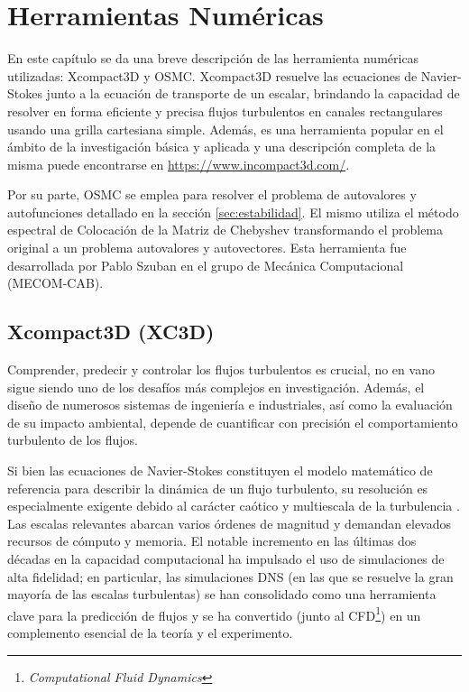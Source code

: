\chapter{Herramientas Numéricas} \label{cap:numerico}

En este capítulo se da una breve descripción de las herramienta numéricas utilizadas: Xcompact3D y OSMC. Xcompact3D resuelve las ecuaciones de Navier-Stokes junto a la ecuación de transporte de un escalar, brindando la capacidad de resolver en forma eficiente y precisa flujos turbulentos en canales rectangulares usando una grilla cartesiana simple. Además, es una herramienta popular en el ámbito de la investigación básica y aplicada y una descripción completa de la misma puede encontrarse en \url{https://www.incompact3d.com/}.

Por su parte, OSMC se emplea para resolver el problema de autovalores y autofunciones detallado en la sección \ref{sec:estabilidad}. El mismo utiliza el método espectral de Colocación de la Matriz de Chebyshev transformando el problema original a un problema autovalores y autovectores. Esta herramienta fue desarrollada por Pablo Szuban \cite{szuban2023} en el grupo de Mecánica Computacional (MECOM-CAB). 


\section{Xcompact3D (XC3D)}

Comprender, predecir y controlar los flujos turbulentos es crucial, no en vano sigue siendo uno de los desafíos más complejos en investigación. Además, el diseño de numerosos sistemas de ingeniería e industriales, así como la evaluación de su impacto ambiental, depende de cuantificar con precisión el comportamiento turbulento de los flujos.

Si bien las ecuaciones de Navier-Stokes constituyen el modelo matemático de referencia para describir la dinámica de un flujo turbulento, su resolución es especialmente exigente debido al carácter caótico y multiescala de la turbulencia \cite{pope2001turbulent}. Las escalas relevantes abarcan varios órdenes de magnitud y demandan elevados recursos de cómputo y memoria. El notable incremento en las últimas dos décadas en la capacidad computacional ha impulsado el uso de simulaciones de alta fidelidad; en particular, las simulaciones DNS (en las que se resuelve la gran mayoría de las escalas turbulentas) se han consolidado como una herramienta clave para la predicción de flujos y se ha convertido (junto al CFD\footnote{\textit{Computational Fluid Dynamics}}) en un complemento esencial de la teoría y el experimento.

